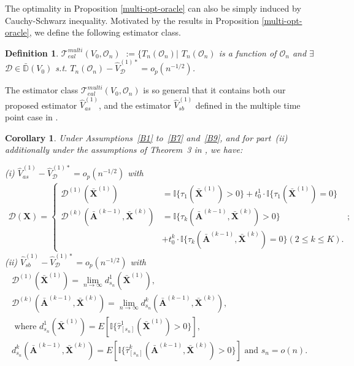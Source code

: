 \documentclass[11pt]{article}
\theoremstyle{referenceplain}
\newtheorem{corollary}{Corollary}[section]
\theoremstyle{referencedefinition}
\newtheorem{definition}{Definition}
\theoremstyle{referenceremark}
\begin{document}
The optimality in Proposition \ref{multi-opt-oracle} can also be simply induced by Cauchy-Schwarz inequality. Motivated by the results in Proposition \ref{multi-opt-oracle}, we define the following estimator class.
\setcounter{definition}{2}
\begin{definition}%
    $\mathcal{T}_{eal}^{multi}(V_0,\mathcal{O}_n)$ $:=$$\{T_n(\mathcal{O}_n)|$ $T_n(\mathcal{O}_n)$ is a function of $\mathcal{O}_n$ and $\exists$ $\mathcal{D}\in\bar{\mathbb{D}}(V_0)$ s.t. $T_n(\mathcal{O}_n) - \widehat{V}_{\mathcal{D}}^{(1)*} = o_p(n^{-1/2})$.
\end{definition}

The estimator class $\mathcal{T}_{eal}^{multi}(V_0,\mathcal{O}_n)$ is so general that it contains both our proposed estimator $\widehat{V}_{as}^{(1)}$, and the estimator $\widehat{V}_{sb}^{(1)}$ defined in the multiple time point case in \citet{shi2020breaking}.
\begin{corollary}\label{multi-embedding}
Under Assumptions~\ref{B1} to~\ref{B7} and~\ref{B9}, 
and for part~(ii) additionally under the assumptions of 
Theorem~3 in \citet{shi2020breaking}, we have:

    (i) $\widehat{V}_{as}^{(1)}-\widehat{V}_{\mathcal{D}}^{(1)*}
    =o_p(n^{-1/2})$ with 
    \begin{align*}    
    \mathcal{D}(\mathbf{X})
    =\left\{ \begin{array}{lll}
 \mathcal{D}^{(1)}(\bar{\mathbf{X}}^{(1)})&=\mathbb{I}\{\tau_1
 (\bar{\mathbf{X}}^{(1)})>0\}+t_0^1\cdot \mathbb{I}\{\tau_1
 (\bar{\mathbf{X}}^{(1)})=0\}\\
  \mathcal{D}^{(k)}(\bar{\mathbf{A}}^{(k-1)},
  \bar{\mathbf{X}}^{(k)})&=\mathbb{I}\{\tau_k
  (\bar{\mathbf{A}}^{(k-1)},\bar{\mathbf{X}}^{(k)})>0\}\\
  &+t_0^k\cdot\mathbb{I}\{\tau_k(\bar{\mathbf{A}}^{(k-1)},
  \bar{\mathbf{X}}^{(k)})=0\} (2\leq k\leq K). 
\end{array} \right.;
    \end{align*}
    (ii)  $\widehat{V}_{sb}^{(1)}-\widehat{V}_{\mathcal{D}}^{(1)*}
    =o_p(n^{-1/2})$ with
    \begin{align*}
    \mathcal{D}^{(1)}(\bar{\mathbf{X}}^{(1)})
    =\displaystyle{\lim_{n\to\infty}}d_{s_n}^1
    (\bar{\mathbf{X}}^{(1)}),\\
     \mathcal{D}^{(k)}(\bar{\mathbf{A}}^{(k-1)},
     \bar{\mathbf{X}}^{(k)})=\displaystyle{\lim_{n\to\infty}}
     d_{s_n}^k(\bar{\mathbf{A}}^{(k-1)},
     \bar{\mathbf{X}}^{(k)}),\\
        \text{ where } d_{s_n}^1(\bar{\mathbf{X}}^{(1)})
        =E[\mathbb{I}\{\widehat{\tau}_{[s_n]}^1
        (\bar{\mathbf{X}}^{(1)})>0\}], \\ 
        d_{s_n}^k(\bar{\mathbf{A}}^{(k-1)},
        \bar{\mathbf{X}}^{(k)})=E[\mathbb{I}\{
        \widehat{\tau}_{[s_n]}^k(\bar{\mathbf{A}}^{(k-1)},
        \bar{\mathbf{X}}^{(k)})>0\}]\text{ and } s_n=o(n).
    \end{align*}
\end{corollary}
\end{document}

